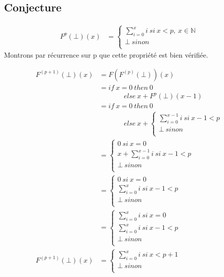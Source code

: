 \documentclass[11pt,a4paper]{article}
\newcommand{\bb}[1]{\mathbb{#1}}
\begin{document}
	\subsection{Conjecture}
	
	\begin{align*}
		F^p(\bot)(x) &= \begin{cases}
							\sum_{i=0}^{x}i\ si\ x < p,\ x \in \bb{N}\\
							\bot\ sinon\\
						\end{cases}
	\end{align*}
	Montrons par récurrence sur p que cette propriété est bien vérifiée.
	
	\begin{align*}
		F^{(p+1)}(\bot)(x) &= F(F^{(p)}(\bot))(x)\\
		&= if\ x = 0\ then\ 0\\
		&\ \ \ \ \ \ \ \ \ \ \ \ \ \ \ \ else\ x + F^p(\bot)(x - 1)\\
		&= if\ x = 0\ then\ 0\\
		&\ \ \ \ \ \ \ \ \ \ \ \ \ \ \ \ else\ x + \begin{cases}
														\sum_{i=0}^{x- 1}i\ si\ x - 1 < p\\
														\bot\ sinon\\
													\end{cases}\\
		&=	\begin{cases}
				0\ si\ x = 0\\
				x + \sum_{i= 0}^{x - 1}i\ si\ x - 1 < p\\
				\bot\ sinon\\
			\end{cases}\\
		&=	\begin{cases}
				0\ si\ x = 0\\
				\sum_{i= 0}^{x}i\ si\ x - 1 < p\\
				\bot\ sinon\\
			\end{cases}\\
		&=	\begin{cases}
				\sum_{i= 0}^{x}i\ si\ x = 0\\
				\sum_{i= 0}^{x}i\ si\ x - 1 < p\\
				\bot\ sinon\\
			\end{cases}\\
		F^{(p + 1)}(\bot)(x) &=	\begin{cases}
									\sum_{i= 0}^{x}i\ si\ x < p + 1\\
									\bot\ sinon\\
								\end{cases}\\
	\end{align*}
	
\end{document}
